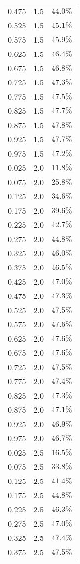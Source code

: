 \begin{longtable}{rrr}
0.475 & 1.5 & $44.0\%$ \\ 
0.525 & 1.5 & $45.1\%$ \\ 
0.575 & 1.5 & $45.9\%$ \\ 
0.625 & 1.5 & $46.4\%$ \\ 
0.675 & 1.5 & $46.8\%$ \\ 
0.725 & 1.5 & $47.3\%$ \\ 
0.775 & 1.5 & $47.5\%$ \\ 
0.825 & 1.5 & $47.7\%$ \\ 
0.875 & 1.5 & $47.8\%$ \\ 
0.925 & 1.5 & $47.7\%$ \\ 
0.975 & 1.5 & $47.2\%$ \\ 
0.025 & 2.0 & $11.8\%$ \\ 
0.075 & 2.0 & $25.8\%$ \\ 
0.125 & 2.0 & $34.6\%$ \\ 
0.175 & 2.0 & $39.6\%$ \\ 
0.225 & 2.0 & $42.7\%$ \\ 
0.275 & 2.0 & $44.8\%$ \\ 
0.325 & 2.0 & $46.0\%$ \\ 
0.375 & 2.0 & $46.5\%$ \\ 
0.425 & 2.0 & $47.0\%$ \\ 
0.475 & 2.0 & $47.3\%$ \\ 
0.525 & 2.0 & $47.5\%$ \\ 
0.575 & 2.0 & $47.6\%$ \\ 
0.625 & 2.0 & $47.6\%$ \\ 
0.675 & 2.0 & $47.6\%$ \\ 
0.725 & 2.0 & $47.5\%$ \\ 
0.775 & 2.0 & $47.4\%$ \\ 
0.825 & 2.0 & $47.3\%$ \\ 
0.875 & 2.0 & $47.1\%$ \\ 
0.925 & 2.0 & $46.9\%$ \\ 
0.975 & 2.0 & $46.7\%$ \\ 
0.025 & 2.5 & $16.5\%$ \\ 
0.075 & 2.5 & $33.8\%$ \\ 
0.125 & 2.5 & $41.4\%$ \\ 
0.175 & 2.5 & $44.8\%$ \\ 
0.225 & 2.5 & $46.3\%$ \\ 
0.275 & 2.5 & $47.0\%$ \\ 
0.325 & 2.5 & $47.4\%$ \\ 
0.375 & 2.5 & $47.5\%$ \\ 

\end{longtable}
